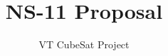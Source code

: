 \documentclass[12pt,a4paper]{article}
\author{VT CubeSat Project}
\title{NS-11 Proposal}
\begin{document}
\maketitle
\pagebreak
\tableofcontents
\pagebreak












\pagebreak


\end{document}
